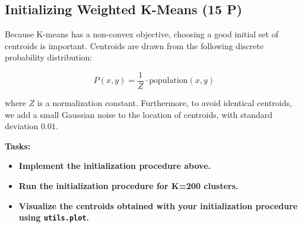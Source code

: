 \documentclass[11pt]{article}
\providecommand{\tightlist}{%
      \setlength{\itemsep}{0pt}\setlength{\parskip}{0pt}}
\begin{document}
    \subsection{Initializing Weighted K-Means (15
P)}\label{initializing-weighted-k-means-15-p}

Because K-means has a non-convex objective, choosing a good initial set
of centroids is important. Centroids are drawn from the following
discrete probability distribution:

\[
P(x,y) = \frac1Z \cdot \text{population}(x,y)
\]

where \(Z\) is a normalization constant. Furthermore, to avoid identical
centroids, we add a small Gaussian noise to the location of centroids,
with standard deviation \(0.01\).

\textbf{Tasks:}

\begin{itemize}
\tightlist
\item
  \textbf{Implement the initialization procedure above.}
\item
  \textbf{Run the initialization procedure for K=200 clusters.}
\item
  \textbf{Visualize the centroids obtained with your initialization
  procedure using \texttt{utils.plot}.}
\end{itemize}
\end{document}
